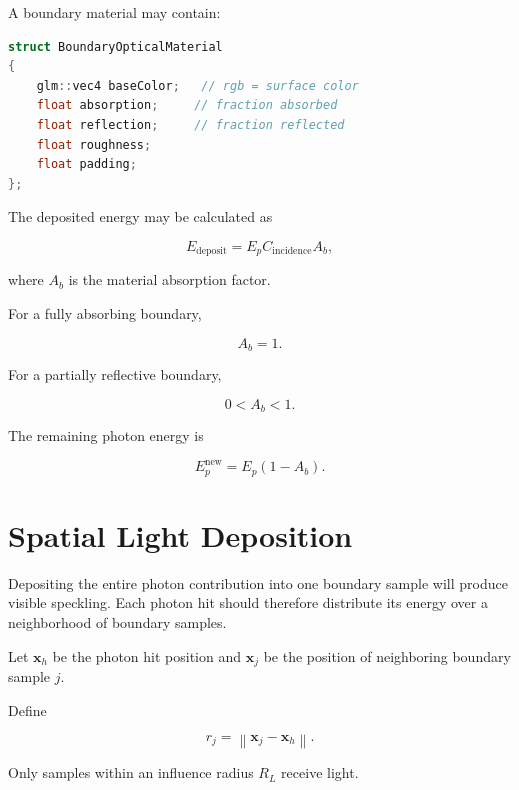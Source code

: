 \documentclass[11pt]{article}
\begin{document}
A boundary material may contain:

\begin{lstlisting}[language=C++]
struct BoundaryOpticalMaterial
{
    glm::vec4 baseColor;   // rgb = surface color
    float absorption;     // fraction absorbed
    float reflection;     // fraction reflected
    float roughness;
    float padding;
};
\end{lstlisting}

The deposited energy may be calculated as

\begin{equation}
    E_{\mathrm{deposit}}
    =
    E_{p}
    C_{\mathrm{incidence}}
    A_{b},
\end{equation}

where $A_{b}$ is the material absorption factor.

For a fully absorbing boundary,

\begin{equation}
    A_{b}=1.
\end{equation}

For a partially reflective boundary,

\begin{equation}
    0 < A_{b} < 1.
\end{equation}

The remaining photon energy is

\begin{equation}
    E_{p}^{\mathrm{new}}
    =
    E_{p}
    \left(
        1-A_{b}
    \right).
\end{equation}

\section{Spatial Light Deposition}

Depositing the entire photon contribution into one boundary sample will produce
visible speckling. Each photon hit should therefore distribute its energy over
a neighborhood of boundary samples.

Let $\mathbf{x}_{h}$ be the photon hit position and $\mathbf{x}_{j}$ be the
position of neighboring boundary sample $j$.

Define

\begin{equation}
    r_{j}
    =
    \left\|
        \mathbf{x}_{j}
        -
        \mathbf{x}_{h}
    \right\|.
\end{equation}

Only samples within an influence radius $R_{L}$ receive light.
\end{document}
